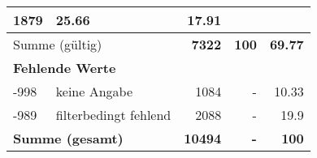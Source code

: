 \begin{longtable}{lXrrr}
       \num{1879} &
       \num[round-mode=places,round-precision=2]{25,66} &
         \num[round-mode=places,round-precision=2]{17,91} \\
     \midrule
     \multicolumn{2}{l}{Summe (gültig)} &
       \textbf{\num{7322}} &
     \textbf{100} &
       \textbf{\num[round-mode=places,round-precision=2]{69,77}} \\
     \multicolumn{5}{l}{\textbf{Fehlende Werte}}\\
       -998 &
       keine Angabe &
         \num{1084} &
        - &
         \num[round-mode=places,round-precision=2]{10,33} \\
       -989 &
       filterbedingt fehlend &
         \num{2088} &
        - &
         \num[round-mode=places,round-precision=2]{19,9} \\
     \midrule
     \multicolumn{2}{l}{\textbf{Summe (gesamt)}} &
          \textbf{\num{10494}} &
        \textbf{-} &
        \textbf{100} \\
     \bottomrule
     \end{longtable}
     

